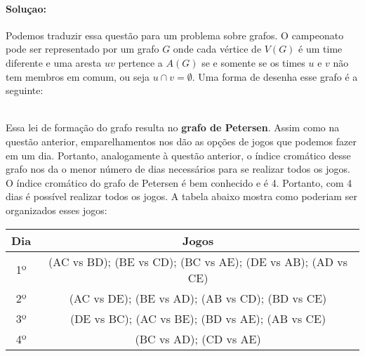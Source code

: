 \documentclass[11pt,a4paper,notitlepage]{exam}
\begin{document}
\paragraph{Soluçao:} Podemos traduzir essa questão para um problema
sobre grafos. O campeonato pode ser representado por um grafo $G$ onde
cada vértice de $V(G)$ é um time diferente e uma aresta $uv$ pertence
a $A(G)$ se e somente se os times $u$ e $v$ não tem membros em comum, ou
seja $u\cap v = \emptyset$.
Uma forma de desenha esse grafo é a seguinte:
\begin{center} 
\end{center}\\
 Essa lei de formação do grafo resulta no \textbf{grafo de
 Petersen}. Assim como na questão anterior, emparelhamentos nos dão
 as opções de jogos que podemos fazer em um dia. Portanto,
 analogamente à questão anterior, o índice cromático desse grafo nos da
 o menor número de dias necessários para se realizar todos os jogos. O
 índice cromático do grafo de Petersen é bem conhecido e é 4. Portanto,
 com 4 dias é possível realizar todos os jogos. A tabela abaixo mostra
 como poderiam ser organizados esses jogos:
\begin{table}[h]
\centering
\begin{tabular}{|c|c|}
\hline
\textbf{Dia}              & \textbf{Jogos}                                             \\ \hline
{\color[HTML]{FE0000} 1º} & (AC vs BD); (BE vs CD); (BC vs AE); (DE vs AB); (AD vs CE) \\ \hline
{\color[HTML]{3166FF} 2º} & (AC vs DE); (BE vs AD); (AB vs CD); (BD vs CE)             \\ \hline
{\color[HTML]{F56B00} 3º} & (DE vs BC); (AC vs BE); (BD vs AE); (AB vs CE)             \\ \hline
{\color[HTML]{32CB00} 4º} & (BC vs AD); (CD vs AE)                                     \\ \hline
\end{tabular}
\end{table}
\end{document}
